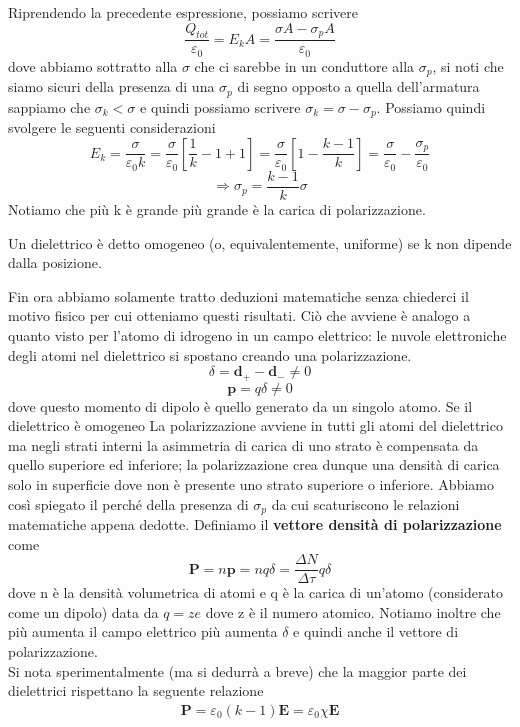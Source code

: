 \documentclass[
10pt, %
a4paper, %
oneside, %
headinclude,footinclude, %
BCOR5mm, %
]{scrartcl}
\begin{document}
Riprendendo la precedente espressione, possiamo scrivere
 \[\frac{Q_{tot}}{\varepsilon_0} = E_k A = \frac{\sigma A - \sigma_p A}{\varepsilon_0}\]
dove abbiamo sottratto alla $\sigma$ che ci sarebbe in un conduttore alla $\sigma_p$, si noti che siamo sicuri della presenza di una $\sigma_p$ di segno opposto a quella dell'armatura  sappiamo che \(\sigma_k<\sigma\) e quindi possiamo scrivere \(\sigma_k = \sigma -\sigma_p\). Possiamo quindi svolgere le seguenti considerazioni
\[E_k = \frac{\sigma }{\varepsilon_0 k} = \frac{\sigma}{\varepsilon_0}\left[\frac{1}{k}-1+1\right] = \frac{\sigma}{\varepsilon_0}\left[1-\frac{k-1}{k}\right] = \frac{\sigma}{\varepsilon_0}-\frac{\sigma_p}{\varepsilon_0}\]
\[\Rightarrow \sigma_p = \frac{k-1}{k}\sigma\]
Notiamo che più k è grande più grande è la carica di polarizzazione.
\begin{definizione}
	Un dielettrico è detto omogeneo (o, equivalentemente, uniforme) se k non dipende dalla posizione.
\end{definizione}
Fin ora abbiamo solamente tratto deduzioni matematiche senza chiederci il motivo fisico per cui otteniamo questi risultati. Ciò che avviene è analogo a quanto visto per l'atomo di idrogeno in un campo elettrico: le nuvole elettroniche degli atomi nel dielettrico si spostano creando una polarizzazione. 
\[\delta = \mathbf{d}_+ -\mathbf{d}_- \neq 0\]
\[\mathbf{p} = q\delta\neq 0\]
dove questo momento di dipolo è quello generato da un singolo atomo. Se il dielettrico è omogeneo La polarizzazione avviene in tutti gli atomi del dielettrico ma negli strati interni la asimmetria di carica di uno strato è compensata da quello superiore ed inferiore; la polarizzazione crea dunque una densità di carica solo in superficie dove non è presente uno strato superiore o inferiore. Abbiamo così spiegato il perché della presenza di \(\sigma_p\) da cui scaturiscono le relazioni matematiche appena dedotte. Definiamo il \textbf{vettore densità di polarizzazione} come
\[\mathbf{P} = n\mathbf{p} = nq\delta = \frac{\Delta N}{\Delta \tau} q \delta \]  
dove n è la densità volumetrica di atomi e q è la carica di un'atomo (considerato come un dipolo) data da \(q = ze\) dove z è il numero atomico. Notiamo inoltre che più aumenta il campo elettrico più aumenta $\delta$ e quindi anche il vettore di polarizzazione.\\
Si nota sperimentalmente (ma si dedurrà a breve) che la maggior parte dei dielettrici rispettano la seguente relazione
\begin{align}\label{eq:polarizzazione_lineare}
	\mathbf{P} = \varepsilon_0(k-1)\mathbf{E} = \varepsilon_0 \chi \mathbf{E}
\end{align}
\end{document}
